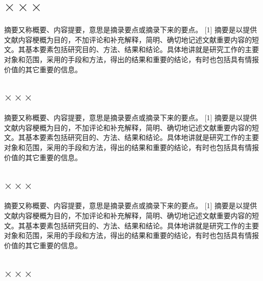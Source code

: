 \documentclass[12pt,oneside,a4paper,fleqn]{ctexart}
\begin{document}
\vspace{0.5em} \section{\heiti $\times \times \times $} \vspace{0.5em}\begin{spacing}{1.25}


摘要又称概要、内容提要，意思是摘录要点或摘录下来的要点。 [1]  摘要是以提供文献内容梗概为目的，不加评论和补充解释，简明、确切地记述文献重要内容的短文。其基本要素包括研究目的、方法、结果和结论。具体地讲就是研究工作的主要对象和范围，采用的手段和方法，得出的结果和重要的结论，有时也包括具有情报价值的其它重要的信息。


\end{spacing}\vspace{0.5em} \subsection{\heiti $\times \times \times $}\begin{spacing}{1.25}

摘要又称概要、内容提要，意思是摘录要点或摘录下来的要点。 [1]  摘要是以提供文献内容梗概为目的，不加评论和补充解释，简明、确切地记述文献重要内容的短文。其基本要素包括研究目的、方法、结果和结论。具体地讲就是研究工作的主要对象和范围，采用的手段和方法，得出的结果和重要的结论，有时也包括具有情报价值的其它重要的信息。


\end{spacing}\vspace{0.5em} \subsection{\heiti $\times \times \times $}\begin{spacing}{1.25}

摘要又称概要、内容提要，意思是摘录要点或摘录下来的要点。 [1]  摘要是以提供文献内容梗概为目的，不加评论和补充解释，简明、确切地记述文献重要内容的短文。其基本要素包括研究目的、方法、结果和结论。具体地讲就是研究工作的主要对象和范围，采用的手段和方法，得出的结果和重要的结论，有时也包括具有情报价值的其它重要的信息。


\end{spacing}\vspace{0.5em} \subsection{\heiti $\times \times \times $}\begin{spacing}{1.25}


\end{spacing}
\end{document}
